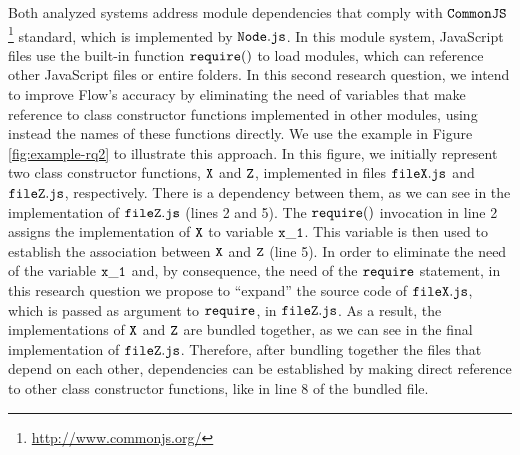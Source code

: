 \documentclass[review]{elsarticle}
\newcommand{\aspas}[1]{{``#1''}}
\newcommand{\mcode}[1]{$\tt #1$}
\begin{document}
Both analyzed systems address module dependencies that comply with \mcode{CommonJS}\footnote{\url{http://www.commonjs.org/}} standard, which is implemented by \mcode{Node.js}. In this module system, JavaScript files use the built-in function \mcode{require()} to load modules, which can reference other JavaScript files or entire folders. In this second research question, we intend to improve Flow's accuracy by eliminating the need of variables that make reference to class constructor functions implemented in other modules, using instead the names of these functions directly. We use the example in Figure \ref{fig:example-rq2} to illustrate this approach. In this figure, we initially represent two class constructor functions, \mcode{X} and \mcode{Z}, implemented in files \mcode{fileX.js} and \mcode{fileZ.js}, respectively. There is a dependency between them, as we can see in the implementation of \mcode{fileZ.js} (lines 2 and 5). The \mcode{require()} invocation in line 2 assigns the implementation of \mcode{X} to variable \mcode{x\_1}. This variable is then used to establish the association between \mcode{X} and \mcode{Z} (line 5). In order to eliminate the need of the variable \mcode{x\_1} and, by consequence, the need of the \mcode{require} statement, in this research question we propose to \aspas{expand} the source code of \mcode{fileX.js}, which is passed as argument to \mcode{require}, in \mcode{fileZ.js}. As a result, the implementations of \mcode{X} and \mcode{Z} are bundled together, as we can see in the final implementation of \mcode{fileZ.js}. Therefore, after bundling together the files that depend on each other, dependencies can be established by making direct reference to other class constructor functions, like in line 8 of the bundled file. 
\end{document}
